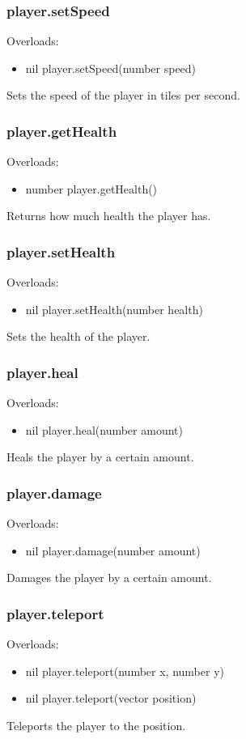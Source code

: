 \documentclass{book}
\newenvironment{ulist}
	{\begin{itemize}
			\itemsep0em}
	{\end{itemize}}
\begin{document}
\subsubsection{player.setSpeed}
Overloads:
\begin{ulist}
	\item nil player.setSpeed(number speed)
\end{ulist}
Sets the speed of the player in tiles per second.

\subsubsection{player.getHealth}
Overloads:
\begin{ulist}
	\item number player.getHealth()
\end{ulist}
Returns how much health the player has.

\subsubsection{player.setHealth}
Overloads:
\begin{ulist}
	\item nil player.setHealth(number health)
\end{ulist}
Sets the health of the player.

\subsubsection{player.heal}
Overloads:
\begin{ulist}
	\item nil player.heal(number amount)
\end{ulist}
Heals the player by a certain amount.

\subsubsection{player.damage}
Overloads:
\begin{ulist}
	\item nil player.damage(number amount)
\end{ulist}
Damages the player by a certain amount.

\subsubsection{player.teleport}
Overloads:
\begin{ulist}
	\item nil player.teleport(number x, number y)
	\item nil player.teleport(vector position)
\end{ulist}
Teleports the player to the position.
\end{document}
